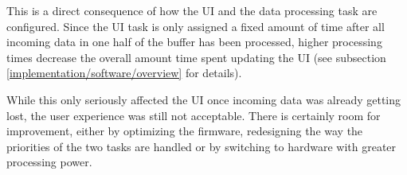 This is a direct consequence of how the UI and the data processing task are configured. Since the UI
task is only assigned a fixed amount of time after all incoming data in one half of the buffer has
been processed, higher processing times decrease the overall amount time spent updating the UI (see
subsection \ref{implementation/software/overview} for details).

While this only seriously affected the UI once incoming data was already getting lost, the user
experience was still not acceptable. There is certainly room for improvement, either by optimizing
the firmware, redesigning the way the priorities of the two tasks are handled or by switching to
hardware with greater processing power.
